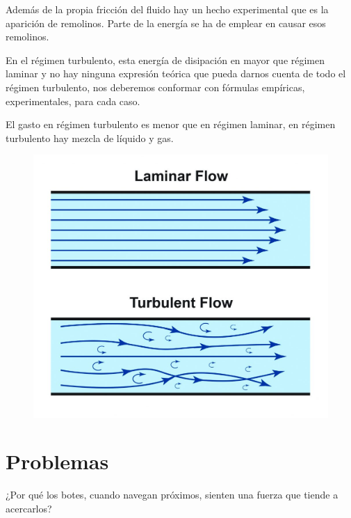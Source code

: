 Además de la propia fricción del fluido hay un hecho experimental que es la aparición de remolinos. Parte de la energía se ha de emplear en causar esos remolinos.

\begin{multicols}{2}
En el régimen turbulento, esta energía de disipación en mayor que régimen laminar y no hay ninguna expresión teórica que pueda darnos cuenta de todo el régimen turbulento, nos deberemos conformar con fórmulas empíricas, experimentales, para cada caso.

El gasto en régimen turbulento es menor que en régimen laminar, en régimen turbulento hay mezcla de líquido y gas.

\begin{figure}[H]
	\centering
	\includegraphics[width=.55\textwidth]{imagenes/imagenes18/T18IM15.png}
	\end{figure}
\end{multicols}


\section{Problemas}

\begin{prob}
¿Por qué los botes, cuando navegan próximos, sienten una fuerza que tiende a acercarlos? 	
\end{prob}

